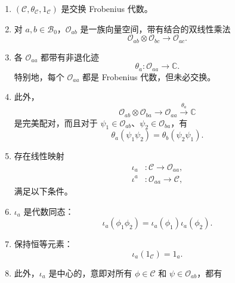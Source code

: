 \begin{enumerate}[label={},leftmargin=2.8em]
\item[1.] $(\mathcal{C},\theta_{\mathcal{C}},1_{\mathcal{C}})$ 是交换 Frobenius 代数。
\item[2a.] 对 $a,b\in\mathcal{B}_0$，$\mathcal{O}_{ab}$ 是一族向量空间，带有结合的双线性乘法
\begin{equation}\label{eq:2.2}
\mathcal{O}_{ab}\otimes\mathcal{O}_{bc}\longrightarrow\mathcal{O}_{ac}.
\end{equation}
\item[2b.] 各 $\mathcal{O}_{aa}$ 都带有非退化迹
\begin{equation}\label{eq:2.3}
\theta_a\colon\mathcal{O}_{aa}\longrightarrow\mathbb{C}.
\end{equation}
特别地，每个 $\mathcal{O}_{aa}$ 都是 Frobenius 代数，但未必交换。
\item[2c.] 此外，
\begin{equation}\label{eq:2.4}
\mathcal{O}_{ab}\otimes\mathcal{O}_{ba}\longrightarrow\mathcal{O}_{aa}\xrightarrow{\theta_a}\mathbb{C}
\end{equation}
是完美配对，而且对于 $\psi_1\in\mathcal{O}_{ab}$、$\psi_2\in\mathcal{O}_{ba}$，有
\begin{equation}\label{eq:2.5}
\theta_a(\psi_1\psi_2)=\theta_b(\psi_2\psi_1).
\end{equation}
\item[3.] 存在线性映射
\begin{equation}\label{eq:2.6}
\begin{aligned}
\iota_a&\colon\mathcal{C}\longrightarrow\mathcal{O}_{aa},\\
\iota^a&\colon\mathcal{O}_{aa}\longrightarrow\mathcal{C},
\end{aligned}
\end{equation}
满足以下条件。
\item[3a.]\label{cond:2.1.2.3a} $\iota_a$ 是代数同态：
\begin{equation}\label{eq:2.7}
\iota_a(\phi_1\phi_2)=\iota_a(\phi_1)\iota_a(\phi_2).
\end{equation}
\item[3b.]\label{cond:2.1.2.3b} 保持恒等元素：
\begin{equation}\label{eq:2.8}
\iota_a(1_{\mathcal{C}})=1_a.
\end{equation}
\item[3c.]\label{cond:2.1.2.3c} 此外，$\iota_a$ 是中心的，意即对所有 $\phi\in\mathcal{C}$ 和 $\psi\in\mathcal{O}_{ab}$，都有

\end{enumerate}
